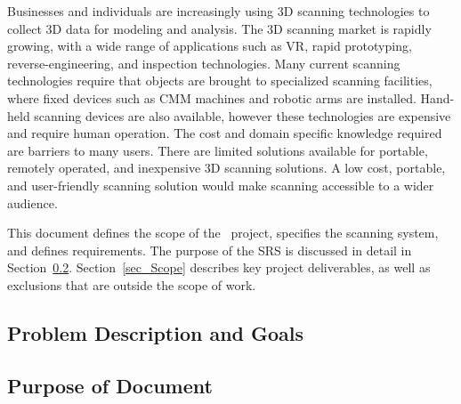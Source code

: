 \documentclass[12pt]{article}
\begin{document}

Businesses and individuals are increasingly using 3D scanning technologies to collect 3D data for modeling and analysis. The 3D scanning market is rapidly growing, with a wide range of applications such as VR, rapid prototyping, reverse-engineering, and inspection technologies. Many current scanning technologies require that objects are brought to specialized scanning facilities, where fixed devices such as CMM machines and robotic arms are installed. Hand-held scanning devices are also available,  however these technologies are expensive and require human operation. The cost and domain specific knowledge required are barriers to many users. There are limited solutions available for portable, remotely operated, and inexpensive 3D scanning solutions.  A low cost, portable, and user-friendly scanning solution would make scanning accessible to a wider audience.
\newline
\par
This document defines the scope of the \progname\ project, specifies the scanning system, and defines requirements. The purpose of the SRS is discussed in detail in Section~\ref{sec_purpose}.  Section~\ref{sec_Scope} describes key project deliverables, as well as exclusions that are outside the scope of work.
\subsection{Problem Description and Goals}

\subsection{Purpose of Document}
\label{sec_purpose}

  
\end{document}
